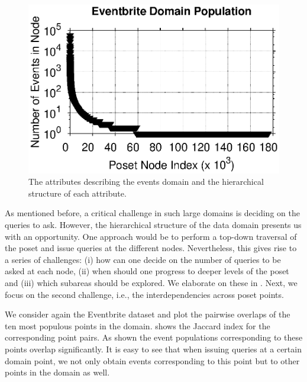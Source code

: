 \begin{figure}
	\begin{center}
	\includegraphics[clip,scale=0.5]{figs/eventbritepop.eps}
	\caption{The attributes describing the events domain and the hierarchical structure of each attribute.}
	\label{fig:eventbritepop}
	\vspace{-20pt}
	\end{center}
\end{figure}

As mentioned before, a critical challenge in such large domains is deciding on the queries to ask. However, the hierarchical structure of the data domain presents us with an opportunity. One approach would be to perform a top-down traversal of the poset and issue queries at the different nodes. Nevertheless, this gives rise to a series of challenges: (i) how can one decide on the number of queries to be asked at each node, (ii) when should one progress to deeper levels of the poset and (iii) which subareas should be explored. We elaborate on these in . Next, we focus on the second challenge, i.e., the interdependencies across poset points. 

\begin{example}
We consider again the Eventbrite dataset and plot the pairwise overlaps of the ten most populous points in the domain.  shows the Jaccard index for the corresponding point pairs. As shown the event populations corresponding to these points overlap significantly. It is easy to see that when issuing queries at a certain domain point, we not only obtain events corresponding to this point but to other points in the domain as well. 
\end{example}

